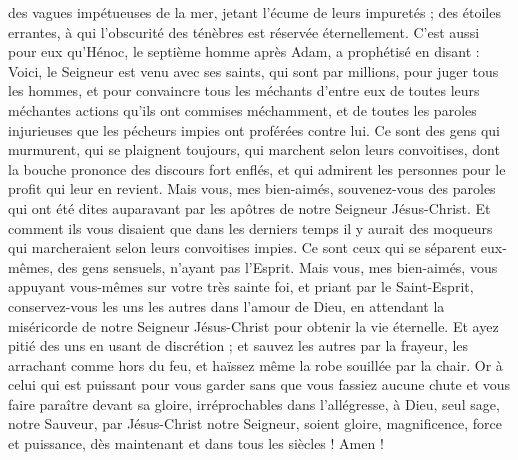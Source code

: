 \begin{multicols}{2}
des vagues impétueuses de la mer, jetant l'écume de leurs impuretés ; des étoiles errantes, à qui l'obscurité des ténèbres est réservée éternellement.
C'est aussi pour eux qu'Hénoc, le septième homme après Adam, a prophétisé en disant :
Voici, le Seigneur est venu avec ses saints, qui sont par millions, pour juger tous les hommes, et pour convaincre tous les méchants d'entre eux de toutes leurs méchantes actions qu'ils ont commises méchamment, et de toutes les paroles injurieuses que les pécheurs impies ont proférées contre lui.
Ce sont des gens qui murmurent, qui se plaignent toujours, qui marchent selon leurs convoitises, dont la bouche prononce des discours fort enflés, et qui admirent les personnes pour le profit qui leur en revient.
Mais vous, mes bien-aimés, souvenez-vous des paroles qui ont été dites auparavant par les apôtres de notre Seigneur Jésus-Christ.
Et comment ils vous disaient que dans les derniers temps il y aurait des moqueurs qui marcheraient selon leurs convoitises impies.
Ce sont ceux qui se séparent eux-mêmes, des gens sensuels, n'ayant pas l'Esprit.
Mais vous, mes bien-aimés, vous appuyant vous-mêmes sur votre très sainte foi, et priant par le Saint-Esprit,
conservez-vous les uns les autres dans l'amour de Dieu, en attendant la miséricorde de notre Seigneur Jésus-Christ pour obtenir la vie éternelle.
Et ayez pitié des uns en usant de discrétion ;
et sauvez les autres par la frayeur, les arrachant comme hors du feu, et haïssez même la robe souillée par la chair.
Or à celui qui est puissant pour vous garder sans que vous fassiez aucune chute et vous faire paraître devant sa gloire, irréprochables dans l'allégresse,
à Dieu, seul sage, notre Sauveur, par Jésus-Christ notre Seigneur, soient gloire, magnificence, force et puissance, dès maintenant et dans tous les siècles ! Amen !
\PPE{}
\end{multicols}
